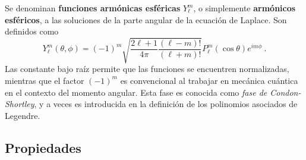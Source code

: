 \begin{defi} 
    Se denominan \textbf{funciones armónicas esféricas} $Y_\ell^m$, o simplemente \textbf{armónicos esféricos}, a las soluciones de la parte angular de la ecuación de Laplace. Son definidos como
    \begin{equation}
        Y_\ell^m(\theta, \phi) = (-1)^m \sqrt{\frac{2\ell + 1}{4\pi} \frac{(\ell-m)!}{(\ell+m)!} } P_\ell^m (\cos\theta) e^{im\phi} \ .
    \end{equation}
    Las constante bajo raíz permite que las funciones se encuentren normalizadas, mientras que el factor $(-1)^m$ es convencional al trabajar en mecánica cuántica en el contexto del momento angular. Esta fase es conocida como \emph{fase de Condon-Shortley}, y a veces es introducida en la definición de los polinomios asociados de Legendre.
\end{defi}



\subsection{Propiedades}

